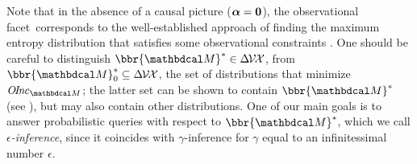 \documentclass{article}
\newcommand\discard[1]{}
\newcommand\obslimit{observational facet} %
\newcommand\voli[1]{{\color{olicolor}\textbf{$\boldsymbol\{$Oli: }#1 \textbf{$\boldsymbol\}$}}}
\begin{document}
Note that in the absence of a causal picture ($\boldsymbol\alpha = \mathbf{0}$), 
the \obslimit\ corresponds to the well-established approach of finding
the maximum entropy distribution that satisfies some observational constraints \parencite{jaynes1957information}.
%
One should be careful to distinguish $\bbr{\dg M}^* \in \Delta\mskip-2mu \V \mskip-2mu\X$,
from $\bbr{\dg M}^*_0 \subseteq \Delta\mskip-2mu \V \mskip-2mu\X$, the set of distributions that minimize
$\OInc_{\dg M}$; the latter set can be shown to contain $\bbr{\dg
  M}^*$ (see \cite{pdg-aaai}),
but may also contain other distributions.
%
\discard\voli{
One of our main goals is to answer probabilistic queries with respect to $\bbr{\dg M}^*$, which we call \emph{$\epsilon$-inference}, 
since it coincides with $\gamma$-inference for $\gamma$ equal to an infinitessimal number $\epsilon$.}
\end{document}
